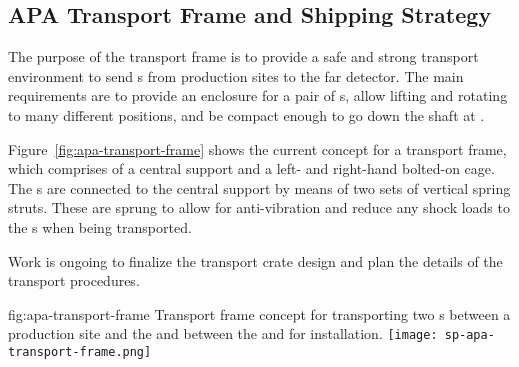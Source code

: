 \subsection{APA Transport Frame and Shipping Strategy}
\label{sec:fdsp-apa-transport-container}

The purpose of the  transport frame is to provide a safe and strong transport environment to send s from production sites to the far detector. The main requirements are to provide an enclosure for a pair of s, allow lifting and rotating to many different positions, and be compact enough to go down the shaft at . 

Figure~\ref{fig:apa-transport-frame} shows the current concept for a transport frame, which comprises of a central support and a left- and right-hand bolted-on cage.  The s are connected to the central support by means of two sets of vertical spring struts. These are sprung to allow for anti-vibration and reduce any shock loads to the s when being transported.  

Work is ongoing to finalize the transport crate design and plan the details of the transport procedures.

\begin{dunefigure}{fig:apa-transport-frame}
{Transport frame concept for transporting two s between a production site and the  and between the  and \surf for installation.}  
\texttt{[image: sp-apa-transport-frame.png]} 
\end{dunefigure}



\begin{comment}
The spring system is shown in Figure~\ref{fig:apa-transport-springs}. It comprises two vertical struts with three springs per pair. The ``wire rope \fixme{isolator?}'' springs are %
manufactured by Vibrostop~\footnote{
Vibrostop\textregistered{} Cavoflex, \url{https://www.vibrostop.it/en/product/wire-rope-isolators/cavoflex/}
}. 
Vibrostop will perform the relevant calculations based on input data, such as methods of travel (by road or by sea) and lifting operations when loading onto a trailer or being manipulated down the shaft at \dword{surf}.

\begin{dunefigure}[APA transport frame spring system]{fig:apa-transport-springs}
{Transport frame designed to transport two \dword{apa}s between production sites and the \dword{sdwf} then to the Ross Headframe at  \dword{surf}.}  \fixme{anne changed caption - no more ITF}
\texttt{[image: sp-apa-transport-spring.png]} \qquad
\texttt{[image: sp-apa-transport-detail.png]} 
\end{dunefigure}
\end{comment}

